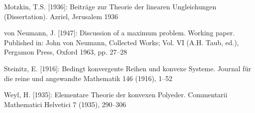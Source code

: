 \begin{description}[font=\normalfont,leftmargin=1em,itemsep=5pt]
\item Motzkin, T.S. [1936]: Beiträge zur Theorie der linearen Ungleichungen (Dissertation). Azriel, Jerusalem 1936
\item von Neumann, J. [1947]: Discussion of a maximum problem. Working paper. Published in: John von Neumann, Collected Works; Vol. VI (A.H. Taub, ed.), Pergamon Press, Oxford 1963, pp. 27--28
\item Steinitz, E. [1916]: Bedingt konvergente Reihen und konvexe Systeme. Journal für die reine und angewandte Mathematik 146 (1916), 1--52
\item Weyl, H. [1935]: Elementare Theorie der konvexen Polyeder. Commentarii Mathematici Helvetici 7 (1935), 290--306
\end{description}
\endgroup
